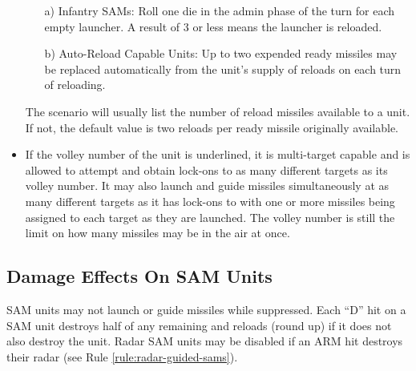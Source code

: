 \begin{itemize}
        \begin{enumerate}
        \item[a)] Infantry SAMs: Roll one die in the admin phase of the turn for each empty launcher. A result of 3 or less means the launcher is reloaded.

    \item[b)] Auto-Reload Capable Units: Up to two expended ready missiles may be replaced automatically from the unit's supply of reloads on each turn of reloading.
\end{enumerate}

The scenario will usually list the number of reload missiles available to a unit. If not, the default value is two reloads per ready missile originally available.

\item{} If the volley number of the unit is underlined, it is multi-target capable and is allowed to attempt and obtain lock-ons to as many different targets as its volley number. It may also launch and guide missiles simultaneously at as many different targets as it has lock-ons to with one or more missiles being assigned to each target as they are launched. The volley number is still the limit on how many missiles may be in the air at once.

\end{itemize}

\subsection{Damage Effects On SAM Units} SAM units may not launch or guide missiles while suppressed. Each “D” hit on a SAM unit destroys half of any remaining  and reloads (round up) if it does not also destroy the unit. Radar SAM units may be disabled if an ARM hit destroys their radar (see Rule \ref{rule:radar-guided-sams}).


